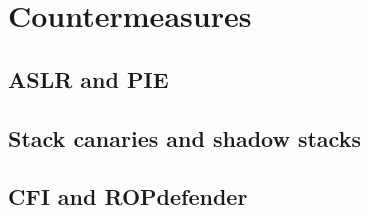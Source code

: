 \section{Countermeasures}
\subsection{ASLR and PIE}



\subsection{Stack canaries and shadow stacks}



\subsection{CFI and ROPdefender}
